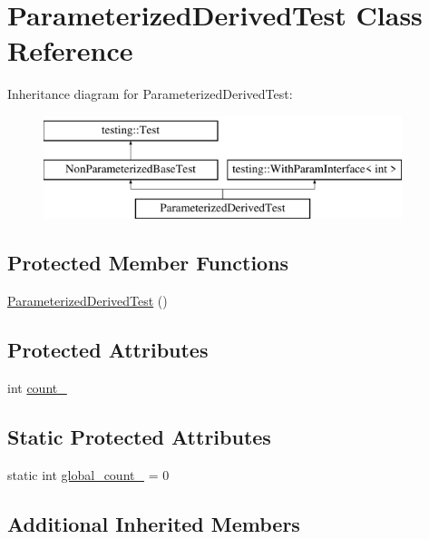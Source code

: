 \hypertarget{classParameterizedDerivedTest}{}\section{Parameterized\+Derived\+Test Class Reference}
\label{classParameterizedDerivedTest}
Inheritance diagram for Parameterized\+Derived\+Test\+:\begin{figure}[H]
\begin{center}
\leavevmode
\includegraphics[height=3.000000cm]{classParameterizedDerivedTest}
\end{center}
\end{figure}
\subsection*{Protected Member Functions}
\begin{DoxyCompactItemize}
\item 
\mbox{\hyperlink{classParameterizedDerivedTest_a5fb176948a078a3754df7b9939568c78}{Parameterized\+Derived\+Test}} ()
\end{DoxyCompactItemize}
\subsection*{Protected Attributes}
\begin{DoxyCompactItemize}
\item 
int \mbox{\hyperlink{classParameterizedDerivedTest_ad8a2968265e7477c13585d17bbd0492c}{count\+\_\+}}
\end{DoxyCompactItemize}
\subsection*{Static Protected Attributes}
\begin{DoxyCompactItemize}
\item 
static int \mbox{\hyperlink{classParameterizedDerivedTest_ab6c067a099764a9d58b5f2e8ebcb5d0f}{global\+\_\+count\+\_\+}} = 0
\end{DoxyCompactItemize}
\subsection*{Additional Inherited Members}


